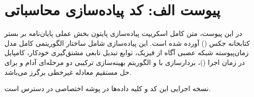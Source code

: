 \chapter*{پیوست الف: کد پیاده‌سازی محاسباتی}
{}

در این پیوست، متن کامل اسکریپت پیاده‌سازی پایتون بخش عملی پایان‌نامه بر بستر کتابخانه جکس () آورده شده است. این پیاده‌سازی شامل ساختار الگوریتمی کامل مدل زمان‌پیوسته شبکه عصبی آگاه از فیزیک، توابع تبدیل تابعی مشتق‌گیری خودکار، کامپایل در زمان اجرا ()، بردارسازی با  و الگوریتم بهینه‌سازی ترکیبی دو مرحله‌ای آدام و  برای حل مستقیم معادله غیرخطی برگرز می‌باشد.

نسخه اجرایی این کد و کلیه داده‌ها در پوشه اختصاصی  در دسترس است.

\begin{singlespace}
\setLTR

\setRTL
\end{singlespace}
